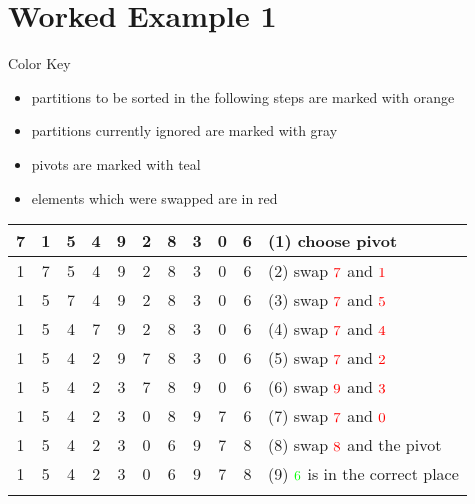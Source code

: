 \section{Worked Example 1}
Color Key
\begin{itemize}
    \item partitions to be sorted in the following steps are marked with {\color{Amber}orange}
    \item partitions currently ignored are marked with {\color{gray}gray}
    \item pivots are marked with {\color{cyan}teal}
    \item elements which were swapped are in {\color{red}red}
\end{itemize}

\begin{center}
    \begin{longtable}{ | c | c | c | c | c | c | c | c | c | c || l | }
        \hline
        7 & 1 & 5 & 4 & 9 & 2 & 8 & 3 & 0 &\cellcolor{LightCyan}6 &(1) choose \color{cyan}pivot\\ \hline %
        \color{red}1 & \color{red}7 & 5 & 4 & 9 & 2 & 8 & 3 & 0 &\cellcolor{LightCyan}6 &(2) swap \(\color{red}7\) and \(\color{red}1\)\\ \hline %
        1 & \color{red}5 & \color{red}7 & 4 & 9 & 2 & 8 & 3 & 0 &\cellcolor{LightCyan}6 &(3) swap \(\color{red}7\) and \(\color{red}5\)\\ \hline %
        1 & 5 & \color{red}4 & \color{red}7 & 9 & 2 & 8 & 3 & 0 &\cellcolor{LightCyan}6 &(4) swap \(\color{red}7\) and \(\color{red}4\)\\ \hline %
        1 & 5 & 4 & \color{red}2 & 9 & \color{red} 7 & 8 & 3 & 0 &\cellcolor{LightCyan}6 &(5) swap \(\color{red}7\) and \(\color{red}2\)\\ \hline %
        1 & 5 & 4 & 2 & \color{red}3 & 7 & 8 & \color{red}9 & 0 &\cellcolor{LightCyan}6 &(6) swap \(\color{red}9\) and \(\color{red}3\)\\ \hline %
        1 & 5 & 4 & 2 & 3 & \color{red}0 & 8 & 9 & \color{red}7 &\cellcolor{LightCyan}6 &(7) swap \(\color{red}7\) and \(\color{red}0\)\\ \hline %
        1 & 5 & 4 & 2 & 3 & 0 & \color{cyan}6 & 9 & 7 & \color{red}8 &(8) swap \(\color{red}8\) and the {\color{cyan}pivot}\\ \hline %
        1 & 5 & 4 & 2 & 3 & 0 & \cellcolor{LightGreen}6 & 9 & 7 & 8 &(9) \(\color{green}6\) is in the correct place \\ \hhline{===========}

\end{longtable}
\end{center}
